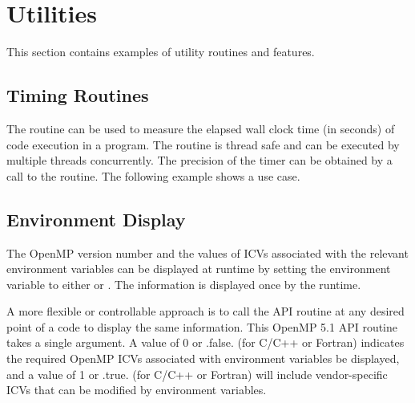 \pagebreak
\section{Utilities}
\label{sec:utilities}
This section contains examples of utility routines and features.

\subsection{Timing Routines}
\label{subsec:get_wtime}

The  routine can be used to measure the elapsed wall
clock time (in seconds) of code execution in a program.
The routine is thread safe and can be executed by multiple threads concurrently.
The precision of the timer can be obtained by a call to
the  routine. The following example shows a use case.




\subsection{Environment Display}
\label{subsec:display_env}

The OpenMP version number and the values of ICVs associated with the relevant
environment variables can be displayed at runtime by setting 
the  environment variable to either 
 or .
The information is displayed once by the runtime.

A more flexible or controllable approach is to call 
the  API routine at any desired
point of a code to display the same information.
This OpenMP 5.1 API routine takes a single  argument.
A value of 0 or .false. (for C/C++ or Fortran) indicates
the required OpenMP ICVs associated with environment variables be displayed,
and a value of 1 or .true. (for C/C++ or Fortran) will include
vendor-specific ICVs that can be modified by environment variables.

